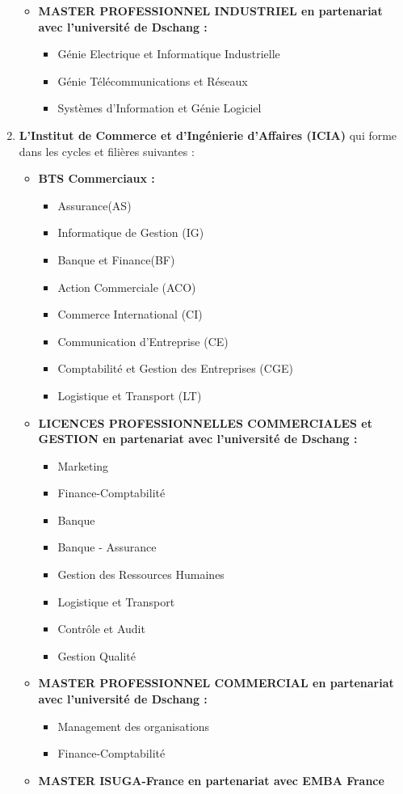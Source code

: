 \begin{enumerate}
\begin{itemize}
		\item \textbf{MASTER PROFESSIONNEL INDUSTRIEL en partenariat avec l’université de Dschang :}
		
		\begin{itemize}
			\item Génie Electrique et Informatique Industrielle
			\item Génie Télécommunications et Réseaux
			\item Systèmes d’Information et Génie Logiciel
		\end{itemize}
	\end{itemize}
	
	\item \textbf{L’Institut de Commerce et d’Ingénierie d’Affaires (ICIA)} qui forme dans les cycles et filières suivantes :
	
	\begin{itemize}
		\item \textbf{BTS Commerciaux :}
		\begin{itemize}
			\item Assurance(AS)
			\item Informatique de Gestion (IG)
			\item Banque et Finance(BF)
			\item Action Commerciale (ACO)
			\item Commerce International (CI)
			\item Communication d’Entreprise (CE)
			\item Comptabilité et Gestion des Entreprises (CGE)
			\item Logistique et Transport (LT)
		\end{itemize}
		\item \textbf{LICENCES PROFESSIONNELLES COMMERCIALES et GESTION
			en partenariat avec l’université de Dschang :}
		\begin{itemize}
			\item Marketing
			\item Finance-Comptabilité
			\item Banque
			\item Banque - Assurance
			\item Gestion des Ressources Humaines
			\item Logistique et Transport
			\item Contrôle et Audit
			\item Gestion Qualité
		\end{itemize}
		\item \textbf{MASTER PROFESSIONNEL COMMERCIAL en partenariat avec l’université de Dschang :}
		\begin{itemize}
			\item Management des organisations
			\item Finance-Comptabilité
		\end{itemize}
		\item \textbf{MASTER ISUGA-France en partenariat avec EMBA France}
	\end{itemize}
	

\end{enumerate}
